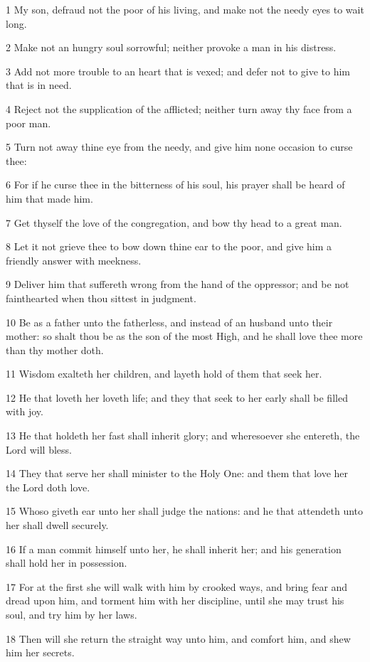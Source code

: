 \par 1 My son, defraud not the poor of his living, and make not the needy eyes to wait long.
\par 2 Make not an hungry soul sorrowful; neither provoke a man in his distress.
\par 3 Add not more trouble to an heart that is vexed; and defer not to give to him that is in need.
\par 4 Reject not the supplication of the afflicted; neither turn away thy face from a poor man.
\par 5 Turn not away thine eye from the needy, and give him none occasion to curse thee:
\par 6 For if he curse thee in the bitterness of his soul, his prayer shall be heard of him that made him.
\par 7 Get thyself the love of the congregation, and bow thy head to a great man.
\par 8 Let it not grieve thee to bow down thine ear to the poor, and give him a friendly answer with meekness.
\par 9 Deliver him that suffereth wrong from the hand of the oppressor; and be not fainthearted when thou sittest in judgment.
\par 10 Be as a father unto the fatherless, and instead of an husband unto their mother: so shalt thou be as the son of the most High, and he shall love thee more than thy mother doth.
\par 11 Wisdom exalteth her children, and layeth hold of them that seek her.
\par 12 He that loveth her loveth life; and they that seek to her early shall be filled with joy.
\par 13 He that holdeth her fast shall inherit glory; and wheresoever she entereth, the Lord will bless.
\par 14 They that serve her shall minister to the Holy One: and them that love her the Lord doth love.
\par 15 Whoso giveth ear unto her shall judge the nations: and he that attendeth unto her shall dwell securely.
\par 16 If a man commit himself unto her, he shall inherit her; and his generation shall hold her in possession.
\par 17 For at the first she will walk with him by crooked ways, and bring fear and dread upon him, and torment him with her discipline, until she may trust his soul, and try him by her laws.
\par 18 Then will she return the straight way unto him, and comfort him, and shew him her secrets.
